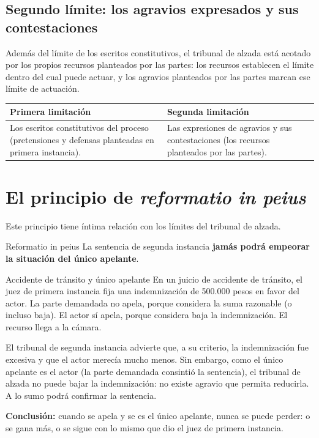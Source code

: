 \documentclass[12pt,oneside]{book}
\begin{document}
\subsection{Segundo límite: los agravios expresados y sus contestaciones}

Además del límite de los escritos constitutivos, el tribunal de alzada está acotado por los propios recursos planteados por las partes: los recursos establecen el límite dentro del cual puede actuar, y los agravios planteados por las partes marcan ese límite de actuación.

\begin{table}[H]
\centering
\small
\begin{tabularx}{\textwidth}{>{\raggedright\arraybackslash}X >{\raggedright\arraybackslash}X}
\toprule
\textbf{Primera limitación} & \textbf{Segunda limitación} \\
\midrule
Los escritos constitutivos del proceso (pretensiones y defensas planteadas en primera instancia). &
Las expresiones de agravios y sus contestaciones (los recursos planteados por las partes). \\
\bottomrule
\end{tabularx}
\end{table}

\section{El principio de \textit{reformatio in peius}}

Este principio tiene íntima relación con los límites del tribunal de alzada.

\begin{definition}{Reformatio in peius}
La sentencia de segunda instancia \textbf{jamás podrá empeorar la situación del único apelante}.
\end{definition}

\begin{example}{Accidente de tránsito y único apelante}
En un juicio de accidente de tránsito, el juez de primera instancia fija una indemnización de 500.000 pesos en favor del actor. La parte demandada no apela, porque considera la suma razonable (o incluso baja). El actor sí apela, porque considera baja la indemnización. El recurso llega a la cámara.

El tribunal de segunda instancia advierte que, a su criterio, la indemnización fue excesiva y que el actor merecía mucho menos. Sin embargo, como el único apelante es el actor (la parte demandada consintió la sentencia), el tribunal de alzada no puede bajar la indemnización: no existe agravio que permita reducirla. A lo sumo podrá confirmar la sentencia.

\textbf{Conclusión:} cuando se apela y se es el único apelante, nunca se puede perder: o se gana más, o se sigue con lo mismo que dio el juez de primera instancia.
\end{example}
\end{document}
